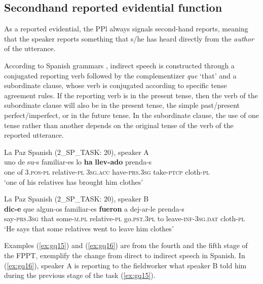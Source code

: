 \documentclass[output=paper]{langsci/langscibook}
\begin{document}
\subsection{Secondhand reported evidential function}\label{s:gq4-2}

As a reported evidential, the PPl always signals second-hand reports, meaning that the speaker reports something that s/he has heard directly from the \textit{author} of the utterance.

According to Spanish grammars \citep{Maldona1999}, indirect speech is constructed through a conjugated reporting verb followed by the complementizer \textit{que} ‘that’ and a subordinate clause, whose verb is conjugated according to specific tense agreement rules. If the reporting verb is in the present tense, then the verb of the subordinate clause will also be in the present tense, the simple past/present perfect/imperfect, or in the future tense. In the subordinate clause, the use of one tense rather than another depends on the original tense of the verb of the reported utterance.

\ea La Paz Spanish (2\_SP\_TASK: 20), speaker A \label{ex:gq15}\\
	\gll uno de su-s familiar-es lo \textbf{ha} \textbf{llev-ado} prenda-s\\
	one of \textsc{3.pos}-\textsc{pl} relative-\textsc{pl} \textsc{3sg.acc} have-\textsc{prs.3sg} take-\textsc{ptcp} cloth-\textsc{pl}\\
	\glt ‘one of his relatives has brought him clothes’
\z	

\ea La Paz Spanish (2\_SP\_TASK: 20), speaker B \label{ex:gq16}\\
	\gll \textbf{dic-e} que algun-os familiar-es \textbf{fueron} a dej-ar-le prenda-s\\
	say-\textsc{prs.3sg} that some-\textsc{m.pl} relative-\textsc{pl} go.\textsc{pst.3pl} to leave-\textsc{inf-3sg.dat} cloth-\textsc{pl}\\
	\glt ‘He says that some relatives went to leave him clothes’
\z

Examples (\ref{ex:gq15}) and (\ref{ex:gq16}) are from the fourth and the fifth stage of the FPPT, exemplify the change from direct to indirect speech in Spanish. In (\ref{ex:gq16}), speaker A is reporting to the fieldworker what speaker B told him during the previous stage of the task (\ref{ex:gq15}).
\end{document}
